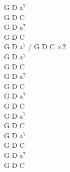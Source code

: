 \documentclass[a5paper, 10pt]{book}
\begin{document}
\begin{minipage}[t]{0.3\textwidth}
  G D a$^7$\\
  G D C\\
  G D a$^7$\\
  G D C\\

  G D a$^7$ / G D C $\times$2\\

  G D a$^7$\\
  G D C\\
  G D a$^7$\\
  G D C\\

  G D a$^7$\\
  G D C\\
  G D a$^7$\\
  G D C\\

  G D a$^7$\\
  G D C\\
  G D a$^7$\\
  G D C\\

\end{minipage}

\newpage
\end{document}
